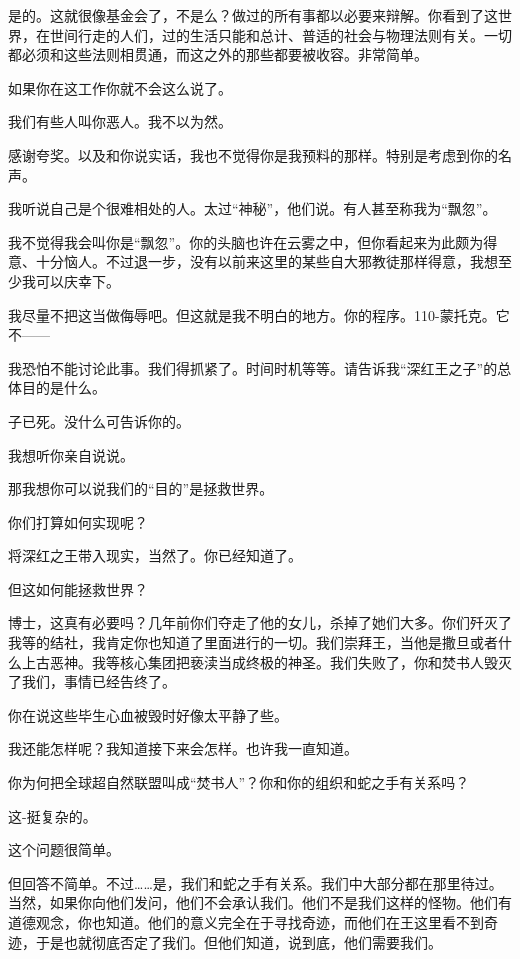 \begin{scpbox}
是的。这就很像基金会了，不是么？做过的所有事都以必要来辩解。你看到了这世界，在世间行走的人们，过的生活只能和总计、普适的社会与物理法则有关。一切都必须和这些法则相贯通，而这之外的那些都要被收容。非常简单。

如果你在这工作你就不会这么说了。

我们有些人叫你恶人。我不以为然。

感谢夸奖。以及和你说实话，我也不觉得你是我预料的那样。特别是考虑到你的名声。

我听说自己是个很难相处的人。太过“神秘”，他们说。有人甚至称我为“飘忽”。

我不觉得我会叫你是“飘忽”。你的头脑也许在云雾之中，但你看起来为此颇为得意、十分恼人。不过退一步，没有以前来这里的某些自大邪教徒那样得意，我想至少我可以庆幸下。

我尽量不把这当做侮辱吧。但这就是我不明白的地方。你的程序。110-蒙托克。它不——

我恐怕不能讨论此事。我们得抓紧了。时间时机等等。请告诉我“深红王之子”的总体目的是什么。

子已死。没什么可告诉你的。

我想听你亲自说说。

那我想你可以说我们的“目的”是拯救世界。

你们打算如何实现呢？

将深红之王带入现实，当然了。你已经知道了。

但这如何能拯救世界？

博士，这真有必要吗？几年前你们夺走了他的女儿，杀掉了她们大多。你们歼灭了我等的结社，我肯定你也知道了里面进行的一切。我们崇拜王，当他是撒旦或者什么上古恶神。我等核心集团把亵渎当成终极的神圣。我们失败了，你和焚书人毁灭了我们，事情已经告终了。

你在说这些毕生心血被毁时好像太平静了些。

我还能怎样呢？我知道接下来会怎样。也许我一直知道。

你为何把全球超自然联盟叫成“焚书人”？你和你的组织和蛇之手有关系吗？

这-挺复杂的。

这个问题很简单。

但回答不简单。不过……是，我们和蛇之手有关系。我们中大部分都在那里待过。当然，如果你向他们发问，他们不会承认我们。他们不是我们这样的怪物。他们有道德观念，你也知道。他们的意义完全在于寻找奇迹，而他们在王这里看不到奇迹，于是也就彻底否定了我们。但他们知道，说到底，他们需要我们。


\end{scpbox}
